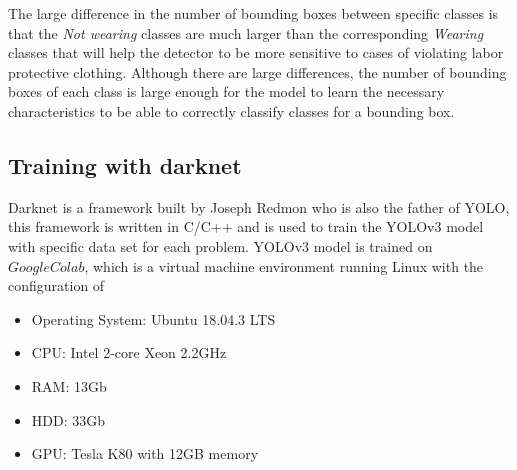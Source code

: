 \documentclass[conference]{IEEEtran}
\begin{document}
The large difference in the number of bounding boxes between specific classes is that the \emph{Not wearing} classes are much larger than the corresponding \emph{Wearing} classes that will help the detector to be more sensitive to cases of violating labor protective clothing. Although there are large differences, the number of bounding boxes of each class is large enough for the model to learn the necessary characteristics to be able to correctly classify classes for a bounding box.
\subsection{Training with darknet}
Darknet \cite{alexey:2020:darknet} is a framework built by Joseph Redmon who is also the father of YOLO, this framework is written in C/C++ and is used to train the YOLOv3 model with specific data set for each problem. YOLOv3 model is trained on $ Google Colab $, which is a virtual machine environment running Linux with the configuration of
\begin{itemize}
	\item Operating System: Ubuntu 18.04.3 LTS
	\item CPU: Intel 2-core Xeon 2.2GHz
	\item RAM: 13Gb
	\item HDD: 33Gb
	\item GPU: Tesla K80 with 12GB memory
\end{itemize}
\end{document}
